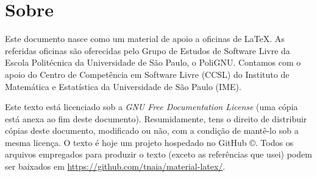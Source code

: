 \section*{Sobre}

Este documento nasce como um material de apoio a oficinas de
\LaTeX. As referidas oficinas são oferecidas pelo Grupo de Estudos de
Software Livre da Escola Politécnica da Universidade de São Paulo, o
PoliGNU. Contamos com o apoio do Centro de Competência em Software Livre (CCSL) do Instituto de Matemática e Estatística da Universidade de São Paulo (IME).

Este texto está licenciado sob a \emph{GNU Free
Documentation License} (uma cópia está anexa ao fim deste documento).
Resumidamente, tens o direito de distribuir cópias deste documento,
modificado ou não, com a condição de mantê-lo sob a mesma licença.
O texto é hoje um projeto hospedado no GitHub \copyright. Todos os
arquivos empregados para produzir o texto (exceto as referências que
usei) podem ser baixados em
\url{https://github.com/tnaia/material-latex/}.
 

\clearpage
